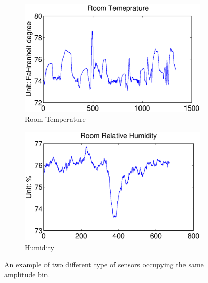 \begin{figure}[ht!]
\centering
  \begin{subfigure}{0.22\textwidth}
                \centering
    \includegraphics[width=\textwidth]{./fig/rmt_ex.eps}
                \caption{Room Temperature}
  \end{subfigure}
  \begin{subfigure}{0.22\textwidth}
                \centering
    \includegraphics[width=\textwidth]{./fig/rh_ex.eps}
                \caption{Humidity}
  \end{subfigure}
\caption{An example of two different type of sensors occupying the same amplitude bin.}
\label{fig:same_bin}
\end{figure}


